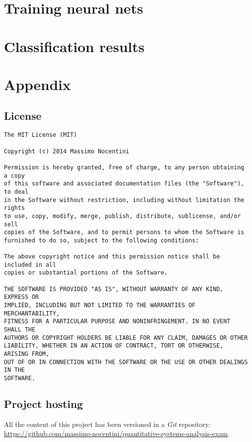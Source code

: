 \documentclass[10pt,a4paper]{article}
\begin{document}
    \section{Training neural nets}
    \lipsum[1]

    \section{Classification results}
    \lipsum[1]

    \newpage

    \section{Appendix}
    \label{sec:appendix}

    \subsection{License}
\begin{verbatim}
The MIT License (MIT)

Copyright (c) 2014 Massimo Nocentini

Permission is hereby granted, free of charge, to any person obtaining a copy
of this software and associated documentation files (the "Software"), to deal
in the Software without restriction, including without limitation the rights
to use, copy, modify, merge, publish, distribute, sublicense, and/or sell
copies of the Software, and to permit persons to whom the Software is
furnished to do so, subject to the following conditions:

The above copyright notice and this permission notice shall be included in all
copies or substantial portions of the Software.

THE SOFTWARE IS PROVIDED "AS IS", WITHOUT WARRANTY OF ANY KIND, EXPRESS OR
IMPLIED, INCLUDING BUT NOT LIMITED TO THE WARRANTIES OF MERCHANTABILITY,
FITNESS FOR A PARTICULAR PURPOSE AND NONINFRINGEMENT. IN NO EVENT SHALL THE
AUTHORS OR COPYRIGHT HOLDERS BE LIABLE FOR ANY CLAIM, DAMAGES OR OTHER
LIABILITY, WHETHER IN AN ACTION OF CONTRACT, TORT OR OTHERWISE, ARISING FROM,
OUT OF OR IN CONNECTION WITH THE SOFTWARE OR THE USE OR OTHER DEALINGS IN THE
SOFTWARE.
\end{verbatim}

    \subsection{Project hosting}
    All the content of this project has been versioned in a \emph{Git} repository:\\
    \url{https://github.com/massimo-nocentini/quantitative-systems-analysis-exam}.\\
\end{document}
